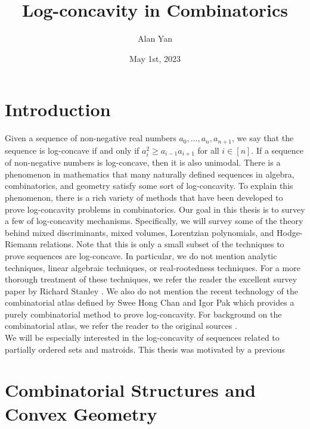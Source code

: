 \documentclass{puthesis-UG}
\author{Alan Yan}
\title{Log-concavity in Combinatorics}
\date{May 1st, 2023}
\begin{document}
\chapter*{Introduction}

Given a sequence of non-negative real numbers $a_0, \ldots, a_n, a_{n+1}$, we say that the sequence is log-concave if and only if $a_i^2 \geq a_{i-1} a_{i+1}$ for all $i \in [n]$. If a sequence of non-negative numbers is log-concave, then it is also unimodal. There is a phenomenon in mathematics that many naturally defined sequences in algebra, combinatorics, and geometry satisfy some sort of log-concavity. To explain this phenomenon, there is a rich variety of methods that have been developed to prove log-concavity problems in combinatorics. Our goal in this thesis is to survey a few of log-concavity mechanisms. Specifically, we will survey some of the theory behind mixed discriminants, mixed volumes, Lorentzian polynomials, and Hodge-Riemann relations. Note that this is only a small subset of the techniques to prove sequences are log-concave. In particular, we do not mention analytic techniques, linear algebraic techniques, or real-rootedness techniques. For a more thorough treatment of these techniques, we refer the reader the excellent survey paper by Richard Stanley \cite{Stanley1989LogConcaveAU}. We also do not mention the recent technology of the combinatorial atlas defined by Swee Hong Chan and Igor Pak which provides a purely combinatorial method to prove log-concavity. For background on the combinatorial atlas, we refer the reader to the original sources \cite{logconcave-poset-inequalities,combinatorial-atlas}. \\

We will be especially interested in the log-concavity of sequences related to partially ordered sets and matroids. This thesis was motivated by a previous 



\chapter{Combinatorial Structures and Convex Geometry}
\end{document}
